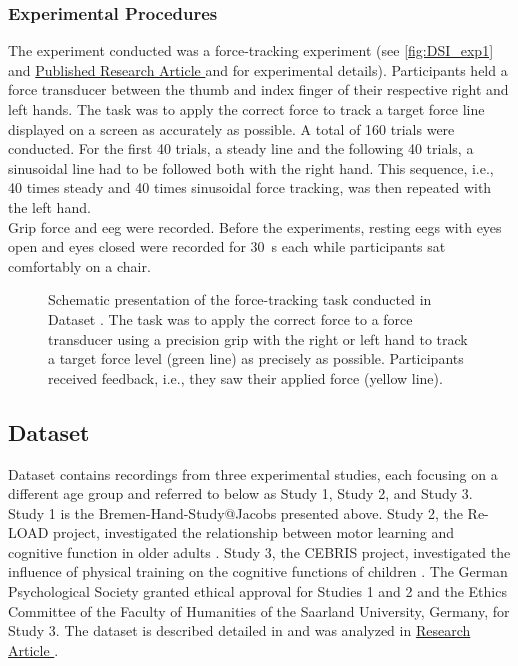 \subsubsection{Experimental Procedures}
\label{methods:datasets:I:experiment}
The experiment conducted was a force-tracking experiment (see \autoref{fig:DSI_exp1} and \hyperref[pub:paperI]{Published Research Article } and \hyperref[pub:paperII]{} for experimental details). Participants held a force transducer between the thumb and index finger of their respective right and left hands. The task was to apply the correct force to track a target force line displayed on a screen as accurately as possible. A total of 160 trials were conducted. For the first 40 trials, a steady line and the following 40 trials, a sinusoidal line had to be followed both with the right hand. This sequence, i.e., 40 times steady and 40 times sinusoidal force tracking, was then repeated with the left hand.\\
Grip force and \gls{eeg} were recorded. Before the experiments, resting \glspl{eeg} with eyes open and eyes closed were recorded for 30~s each while participants sat comfortably on a chair.

\begin{figure}[ht]
\begin{center}

\captionsetup{justification=justified}
\caption[Schematic presentation of the force-tracking task conducted in Dataset ]{Schematic presentation of the force-tracking task conducted in Dataset . The task was to apply the correct force to a force transducer using a precision grip with the right or left hand to track a target force level (green line) as precisely as possible. Participants received feedback, i.e., they saw their applied force (yellow line).}
\label{fig:DSI_exp1}
\end{center}
\end{figure}

\newpage
\subsection{Dataset }
\label{methods:datasets:II}
Dataset  contains recordings from three experimental studies, each focusing on a different age group and referred to below as Study 1, Study 2, and Study 3.\\
Study 1 is the Bremen-Hand-Study@Jacobs presented above. Study 2, the Re-LOAD project, investigated the relationship between motor learning and cognitive function in older adults \cite{Hübner2018a, Hübner2018b}. Study 3, the CEBRIS project, investigated the influence of physical training on the cognitive functions of children \cite{Koutsandreou2016}. The German Psychological Society granted ethical approval for Studies 1 and 2 and the Ethics Committee of the Faculty of Humanities of the Saarland University, Germany, for Study 3. The dataset is described detailed in \cite{Reuter2019} and was analyzed in \hyperref[results:paperII]{Research Article }.

